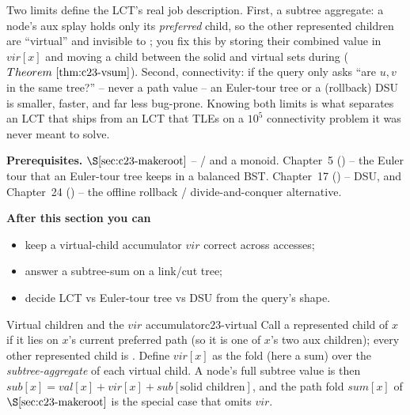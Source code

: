 \begin{topicintro}
Two limits define the LCT's real job description. First, a subtree aggregate: a
node's aux splay holds only its \emph{preferred} child, so the other represented
children are ``virtual'' and invisible to ; you fix this by storing their
combined value in \(\mathit{vir}[x]\) and moving a child between the solid and
virtual sets during  (\(\thmref{c23-vsum}\)). Second, connectivity: if the
query only asks ``are \(u,v\) in the same tree?'' -- never a path value -- an
Euler-tour tree or a (rollback) DSU is smaller, faster, and far less bug-prone.
Knowing both limits is what separates an LCT that ships from an LCT that TLEs on a
\(10^5\) connectivity problem it was never meant to solve.

\textbf{Prerequisites.} \(\secref{c23-makeroot}\) -- /
and a  monoid. Chapter~5 () -- the Euler tour that an
Euler-tour tree keeps in a balanced BST. Chapter~17 () -- DSU, and
Chapter~24 () -- the offline rollback / divide-and-conquer alternative.

\textbf{After this section you can}
\begin{itemize}[nosep]
  \item keep a virtual-child accumulator \(\mathit{vir}\) correct across accesses; \hfill{}
  \item answer a subtree-sum on a link/cut tree; \hfill{}
  \item decide LCT vs Euler-tour tree vs DSU from the query's shape. \hfill{}
\end{itemize}
\end{topicintro}

\begin{definition}{Virtual children and the \(\mathit{vir}\) accumulator}{c23-virtual}
Call a represented child of \(x\)  if it lies on \(x\)'s current
preferred path (so it is one of \(x\)'s two aux children); every other represented
child is . Define \(\mathit{vir}[x]\) as the fold (here a sum) over the
\emph{subtree-aggregate} of each virtual child. A node's full subtree value is then
\(\mathit{sub}[x]=\mathit{val}[x]+\mathit{vir}[x]+\mathit{sub}[\text{solid children}]\),
and the path fold \(\mathit{sum}[x]\) of \(\secref{c23-makeroot}\) is the special case
that omits \(\mathit{vir}\).
\end{definition}


